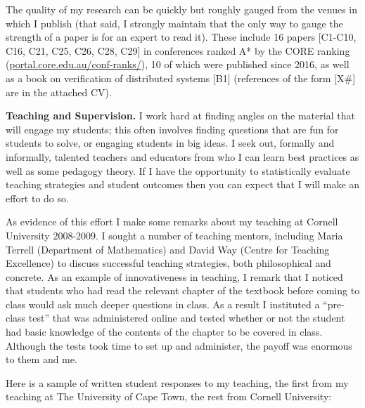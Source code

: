 \documentclass[10,a4paper,sans]{moderncv}
\begin{document}
The quality of my research can be quickly but roughly gauged from the venues in which I publish (that said, I strongly maintain that the only way to gauge the strength of a paper is for an expert to read it). These include 16 papers [C1-C10, C16, C21, C25, C26, C28, C29] in conferences ranked A* by the CORE ranking (\url{portal.core.edu.au/conf-ranks/}), 10 of which were published since 2016, as well as a book on verification of distributed systems [B1] (references of the form [X\#] are in the attached CV).


\textbf{Teaching and Supervision.}
I work hard at finding angles on the material that will engage my students; this
often involves finding questions that are fun for students to solve, or engaging students 
in big ideas. I seek out, formally and informally, talented teachers and educators from who I can learn best practices as well as some pedagogy theory. 
If I have the opportunity to statistically evaluate teaching strategies and student outcomes then you can expect that I will make an effort to do so.

As evidence of this effort I make some remarks about my teaching at Cornell University 2008-2009.
I sought a number of teaching mentors, including Maria Terrell (Department of Mathematics) and David Way (Centre for Teaching Excellence) 
to discuss successful teaching strategies, both philosophical and concrete. As an example of innovativeness in teaching, I remark that I noticed that students who had read the relevant chapter of the textbook before coming to class would ask much deeper questions in class. 
As a result I instituted a ``pre-class test'' that was administered online and tested whether or not the student had basic knowledge of the contents of the chapter to be covered in class. Although the tests took time to set up and administer, the payoff was enormous to them and me. 



Here is a sample of written student responses to my teaching, the first from my teaching at The University of Cape Town, the rest from Cornell University:

\vspace{1mm}
\end{document}
